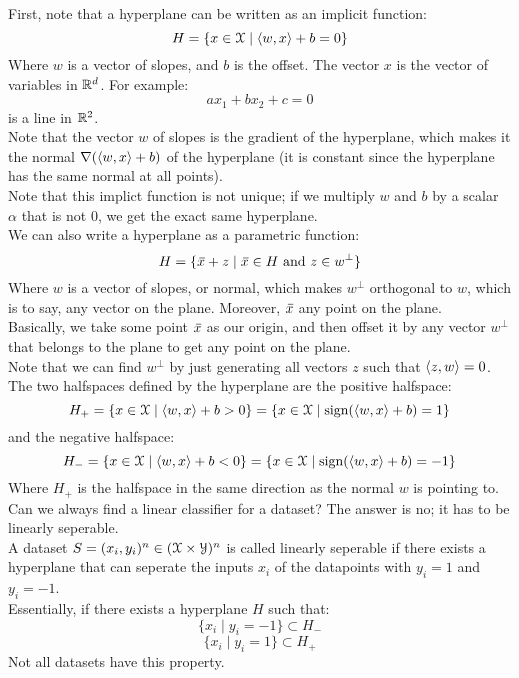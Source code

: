 \documentclass[12pt]{article}
\begin{document}
First, note that a hyperplane can be written
as an implicit function:
\[ H = \{ x \in \mathcal{X} \mid \left\langle w, x \right\rangle + b = 0  \} \]
Where $w$ is a vector of slopes,
and $b$ is the offset. The vector $x$
is the vector of variables in $\mathbb{R}^d$.
For example:
\[ ax_1 + bx_2 + c = 0 \]
is a line in $\mathbb{R}^2$. \\

Note that the vector $w$ of slopes
is the gradient of the hyperplane,
which makes it the normal $\nabla (\left\langle w, x \right\rangle + b)$
of the hyperplane (it is constant
since the hyperplane has the same normal
at all points). \\

Note that this implict function is not unique;
if we multiply $w$ and $b$ by a scalar $\alpha$
that is not $0$, we get the exact same
hyperplane. \\

We can also write a hyperplane
as a parametric function:
\[ H = \{ \,\overline{\!{x}} + z \mid \,\overline{\!{x}} \in H
\text{ and } z \in w^\perp \} \]
Where $w$ is a vector of slopes,
or normal,
which makes $w^\perp$
orthogonal to $w$, which is to say,
any vector on the plane.
Moreover, $\,\overline{\!{x}}$ any point on the plane. \\
Basically, we take some point $\,\overline{\!{x}}$
as our origin, and then offset it by any
vector $w^\perp$ that belongs to the
plane to get any point on the plane. \\

Note that we can find $w^\perp$
by just generating all vectors $z$ such that
$\left\langle z, w \right\rangle = 0$. \\

The two halfspaces defined by the hyperplane are
the positive halfspace:
\[ H_+ = \{ x \in \mathcal{X} \mid \left\langle w, x \right\rangle + b > 0 \}
= \{ x \in \mathcal{X} \mid \text{sign}(\left\langle w, x \right\rangle + b) = 1 \} \]
and the negative halfspace:
\[ H_- = \{ x \in \mathcal{X} \mid \left\langle w, x \right\rangle + b < 0 \}
= \{ x \in \mathcal{X} \mid \text{sign}(\left\langle w, x \right\rangle + b) = -1 \} \]
Where $H_+$ is the halfspace in the same direction
as the normal $w$ is pointing to. \\

Can we always find a linear classifier for a dataset?
The answer is no; it has to be linearly seperable. \\

A dataset $S = (x_i, y_i)^n \in (\mathcal{X} \times \mathcal{Y})^n$
is called linearly seperable if there exists
a hyperplane that can seperate the inputs $x_i$
of the datapoints
with $y_i = 1$ and $y_i = -1$. \\
Essentially, if there exists a hyperplane $H$
such that:
\[ \{x_i \mid y_i = -1\} \subset H_- \]
\[ \{x_i \mid y_i = 1\} \subset H_+ \]
Not all datasets have this property. \\
\end{document}
